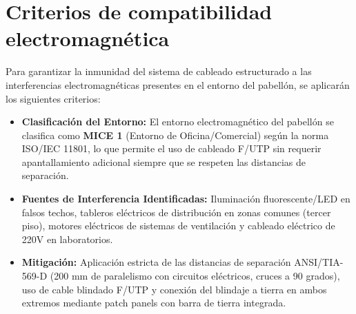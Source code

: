 \section{Criterios de compatibilidad electromagnética}

Para garantizar la inmunidad del sistema de cableado estructurado a las interferencias electromagnéticas presentes en el entorno del pabellón, se aplicarán los siguientes criterios:

\begin{itemize}
    \item \textbf{Clasificación del Entorno:} El entorno electromagnético del pabellón se clasifica como \textbf{MICE 1} (Entorno de Oficina/Comercial) según la norma ISO/IEC 11801, lo que permite el uso de cableado F/UTP sin requerir apantallamiento adicional siempre que se respeten las distancias de separación.
    \item \textbf{Fuentes de Interferencia Identificadas:} Iluminación fluorescente/LED en falsos techos, tableros eléctricos de distribución en zonas comunes (tercer piso), motores eléctricos de sistemas de ventilación y cableado eléctrico de 220V en laboratorios.
    \item \textbf{Mitigación:} Aplicación estricta de las distancias de separación ANSI/TIA-569-D (200 mm de paralelismo con circuitos eléctricos, cruces a 90 grados), uso de cable blindado F/UTP y conexión del blindaje a tierra en ambos extremos mediante patch panels con barra de tierra integrada.
\end{itemize}
